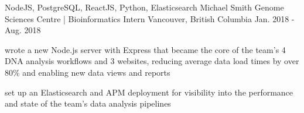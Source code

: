 \begin{cventries}
  \cventry
    {NodeJS, PostgreSQL, ReactJS, Python, Elasticsearch} %
    {Michael Smith Genome Sciences Centre | Bioinformatics Intern} %
    {Vancouver, British Columbia} %
    {Jan. 2018 - Aug. 2018} %
    {
      \begin{cvitems} %
        \item {wrote a new Node.js server with Express that became the core of the team’s 4 DNA analysis workflows and 3 websites, reducing average data load times by over 80\% and enabling new data views and reports}
        \item {set up an Elasticsearch and APM deployment for visibility into the performance and state of the team’s data analysis pipelines}
      \end{cvitems}
    }

\end{cventries}
